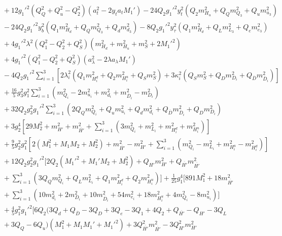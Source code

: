 \documentclass[preprint,amsmath,amssymb,aps,superscriptaddress,prd,showpacs,floatfix,nofootinbib]{revtex4-1}
\begin{document}
\begin{subequations}
\begin{align}
&{}+12g_1'^2\left ( Q_Q^2+Q_u^2-Q_2^2\right )\left ( a_t^2-2y_ta_tM_1'\right )-24Q_2g_1'^2y_t^2\left ( Q_2m_{H_u}^2+Q_Qm_{Q_3}^2+Q_um_{u_3}^2\right )\nonumber\\
&{}-24Q_2g_1'^2y_b^2\left ( Q_1m_{H_d}^2+Q_Qm_{Q_3}^2+Q_dm_{d_3}^2\right )-8Q_2g_1'^2y_\tau^2\left ( Q_1m_{H_d}^2+Q_Lm_{L_3}^2+Q_em_{e_3}^2\right )\nonumber\\
&{}+4g_1'^2\lambda^2\left ( Q_1^2-Q_2^2+Q_S^2\right )\left ( m_{H_d}^2+m_{H_u}^2+m_S^2+2M_1'^2\right )\nonumber\\
&{}+4g_1'^2\left ( Q_1^2-Q_2^2+Q_S^2\right )\left ( a_\lambda^2-2\lambda a_\lambda M_1'\right )\nonumber\\
&{}-4Q_2g_1'^2\sum_{i=1}^3\left [ 2\lambda_i^2\left ( Q_1m_{H_i^d}^2+Q_2m_{H_i^u}^2+Q_Sm_S^2\right )+3\kappa_i^2\left ( Q_Sm_S^2+Q_Dm_{D_i}^2+Q_{\overline{D}}m_{\overline{D}_i}^2\right )\right ]\nonumber\\
&{}+\frac{16}{5}g_3^2g_1^2\sum_{i=1}^3\left ( m_{Q_i}^2-2m_{u_i}^2+m_{d_i}^2+m_{\overline{D}_i}^2-m_{D_i}^2\right )\nonumber\\
&{}+32Q_2g_3^2g_1'^2\sum_{i=1}^3\left ( 2Q_Qm_{Q_i}^2+Q_um_{u_i}^2+Q_dm_{d_i}^2+Q_{\overline{D}}m_{\overline{D}_i}^2+Q_Dm_{D_i}^2\right )\nonumber\\
&{}+3g_2^4\left [ 29M_2^2+m_{H'}^2+m_{\overline{H'}}^2+\sum_{i=1}^3\left ( 3m_{Q_i}^2+m_{L_i}^2+m_{H_i^d}^2+m_{H_i^u}^2\right )\right ]\nonumber\\
&{}+\frac{9}{5}g_2^2g_1^2\left [ 2\left ( M_1^2+M_1M_2+M_2^2\right )+m_{\overline{H'}}^2-m_{H'}^2+\sum_{i=1}^3\left ( m_{Q_i}^2-m_{L_i}^2+m_{H_i^u}^2-m_{H_i^d}^2\right )\right ]\nonumber\\
&{}+12Q_2g_2^2g_1'^2\bigg [ 2Q_2\left ( M_1'^2+M_1'M_2+M_2^2\right )+Q_{H'}m_{H'}^2+Q_{\overline{H'}}m_{\overline{H'}}^2\nonumber\\
&{}+\sum_{i=1}^3\left ( 3Q_Qm_{Q_i}^2+Q_Lm_{L_i}^2+Q_1m_{H_i^d}^2+Q_2m_{H_i^u}^2\right )\bigg ]+\frac{1}{25}g_1^4\bigg [ 891M_1^2+18m_{\overline{H'}}^2\nonumber\\
&{}+\sum_{i=1}^3\left ( 10m_{d_i}^2+2m_{D_i}^2+10m_{\overline{D}_i}^2+54m_{e_i}^2+18m_{H_i^u}^2+4m_{Q_i}^2-8m_{u_i}^2\right )\bigg ]\nonumber\\
&{}+\frac{4}{5}g_1^2g_1'^2\bigg [ 6Q_2\big ( 3Q_d+Q_{\overline{D}}-3Q_D+3Q_e-3Q_1+4Q_2+Q_{\overline{H'}}-Q_{H'}-3Q_L\nonumber\\
&{}+3Q_Q-6Q_u\big )\left ( M_1^2+M_1M_1'+M_1'^2\right )+3Q_{\overline{H'}}^2m_{\overline{H'}}^2-3Q_{H'}^2m_{H'}^2\nonumber\\

\end{align}
\end{subequations}
\end{document}
